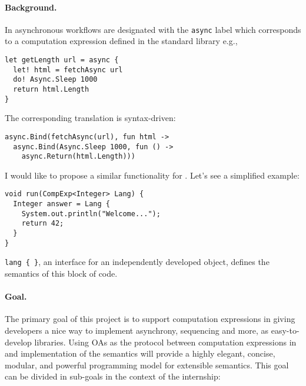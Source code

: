 \documentclass{sigplanconf}
\begin{document}
\paragraph{Background.}

In \fs{} asynchronous workflows are designated with the \verb|async|
label which corresponds to a computation expression defined in the
standard library e.g.,

\begin{lstlisting}[style=fsharp]
let getLength url = async {
  let! html = fetchAsync url
  do! Async.Sleep 1000
  return html.Length
}
\end{lstlisting}

The corresponding translation is syntax-driven:

\begin{lstlisting}[style=fsharp]
async.Bind(fetchAsync(url), fun html ->
  async.Bind(Async.Sleep 1000, fun () ->
    async.Return(html.Length)))
\end{lstlisting}

I would like to propose a similar functionality for \java{}. Let's see
a simplified example:

\begin{lstlisting}[style=java]
void run(CompExp<Integer> Lang) {
  Integer answer = Lang { 
    System.out.println("Welcome...");
    return 42;
  }
}
\end{lstlisting}

\noindent\verb|lang { }|, an interface for an independently developed
object, defines the semantics of this block of code.


\paragraph{Goal.}

The primary goal of this project is to support computation expressions
in \java{} giving developers a nice way to implement asynchrony,
sequencing and more, as easy-to-develop libraries. Using OAs as the
protocol between computation expressions in \java{} and implementation
of the semantics will provide a highly elegant, concise, modular, and
powerful programming model for extensible semantics. This goal can be
divided in sub-goals in the context of the internship:
\end{document}
